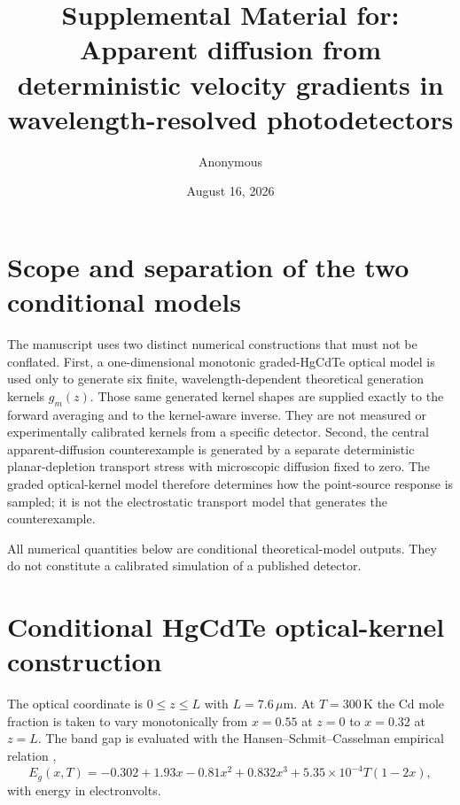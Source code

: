 \documentclass[aps,pra,onecolumn,superscriptaddress,nofootinbib]{revtex4-2}
\begin{document}
\title{Supplemental Material for: Apparent diffusion from deterministic velocity gradients in wavelength-resolved photodetectors}
\author{Anonymous}
\date{August 16, 2026}
\maketitle

\section{Scope and separation of the two conditional models}

The manuscript uses two distinct numerical constructions that must not be conflated.  First, a one-dimensional monotonic graded-HgCdTe optical model is used only to generate six finite, wavelength-dependent theoretical generation kernels $g_m(z)$.  Those same generated kernel shapes are supplied exactly to the forward averaging and to the kernel-aware inverse.  They are not measured or experimentally calibrated kernels from a specific detector.  Second, the central apparent-diffusion counterexample is generated by a separate deterministic planar-depletion transport stress with microscopic diffusion fixed to zero.  The graded optical-kernel model therefore determines how the point-source response is sampled; it is not the electrostatic transport model that generates the counterexample.

All numerical quantities below are conditional theoretical-model outputs.  They do not constitute a calibrated simulation of a published detector.

\section{Conditional HgCdTe optical-kernel construction}

The optical coordinate is $0\le z\le L$ with $L=7.6\,\mu\mathrm{m}$.  At $T=300\,\mathrm{K}$ the Cd mole fraction is taken to vary monotonically from $x=0.55$ at $z=0$ to $x=0.32$ at $z=L$.  The band gap is evaluated with the Hansen--Schmit--Casselman empirical relation \cite{hansen1982gap},
\begin{equation}
E_g(x,T)=-0.302+1.93x-0.81x^2+0.832x^3+5.35\times10^{-4}T(1-2x),
\end{equation}
with energy in electronvolts.
\end{document}
